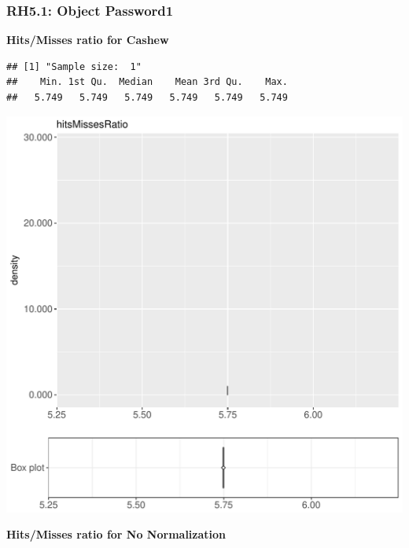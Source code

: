 \documentclass{article}\usepackage[]{graphicx}\usepackage[]{color}
\makeatletter
\def\maxwidth{ %
  \ifdim\Gin@nat@width>\linewidth
    \linewidth
  \else
    \Gin@nat@width
  \fi
}
\newenvironment{kframe}{%
 \def\at@end@of@kframe{}%
 \ifinner\ifhmode%
  \def\at@end@of@kframe{\end{minipage}}%
  \begin{minipage}{\columnwidth}%
 \fi\fi%
 \def\FrameCommand##1{\hskip\@totalleftmargin \hskip-\fboxsep
 \colorbox{shadecolor}{##1}\hskip-\fboxsep
     \hskip-\linewidth \hskip-\@totalleftmargin \hskip\columnwidth}%
 \MakeFramed {\advance\hsize-\width
   \@totalleftmargin\z@ \linewidth\hsize
   \@setminipage}}%
 {\par\unskip\endMakeFramed%
 \at@end@of@kframe}
\newenvironment{knitrout}{}{} %
\makeatother
\begin{document}
\subsubsection{RH5.1: Object Password1}

 \textbf{Hits/Misses ratio for Cashew}
\begin{knitrout}
\color{fgcolor}\begin{kframe}
\begin{verbatim}
## [1] "Sample size:  1"
##    Min. 1st Qu.  Median    Mean 3rd Qu.    Max. 
##   5.749   5.749   5.749   5.749   5.749   5.749
\end{verbatim}


{\ttfamily\noindent\bfseries{}}\end{kframe}
\includegraphics[width=\maxwidth]{figure/RH5_cashew_password-1} 

\end{knitrout}
 \textbf{Hits/Misses ratio for No Normalization}
\end{document}
